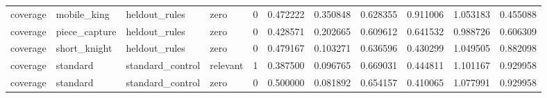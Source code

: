 \begin{tabular}{lllllllllll}
coverage & mobile\_king & heldout\_rules & zero & 0 & 0.472222 & 0.350848 & 0.628355 & 0.911006 & 1.053183 & 0.455088 \\
coverage & piece\_capture & heldout\_rules & zero & 0 & 0.428571 & 0.202665 & 0.609612 & 0.641532 & 0.988726 & 0.606309 \\
coverage & short\_knight & heldout\_rules & zero & 0 & 0.479167 & 0.103271 & 0.636596 & 0.430299 & 1.049505 & 0.882098 \\
coverage & standard & standard\_control & relevant & 1 & 0.387500 & 0.096765 & 0.669031 & 0.444811 & 1.101167 & 0.929958 \\
coverage & standard & standard\_control & zero & 0 & 0.500000 & 0.081892 & 0.654157 & 0.410065 & 1.077991 & 0.929958 \\
\hline
\end{tabular}
